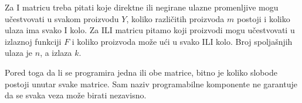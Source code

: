 Za I matricu treba pitati koje direktne ili negirane ulazne promenljive mogu učestvovati u svakom proizvodu \(Y\), koliko različitih proizvoda \(m\) postoji i koliko ulaza ima svako I kolo. Za ILI matricu pitamo koji proizvodi mogu učestvovati u izlaznoj funkciji \(F\) i koliko proizvoda može ući u svako ILI kolo. Broj spoljašnjih ulaza je \(n\), a izlaza \(k\).

Pored toga da li se programira jedna ili obe matrice, bitno je koliko slobode postoji unutar svake matrice. Sam naziv programabilne komponente ne garantuje da se svaka veza može birati nezavisno.
